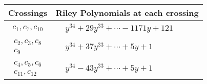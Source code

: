\documentclass[1p]{elsarticle_modified}
\theoremstyle{definition}
\begin{document}
\begin{tabular}{m{50pt}|m{274pt}}
Crossings & \hspace{64pt}Riley Polynomials at each crossing \\
\hline $$\begin{aligned}c_{1},c_{7},c_{10}\end{aligned}$$&$\begin{aligned}
&y^{34}+29 y^{33}+\cdots-1171 y+121
\end{aligned}$\\
\hline $$\begin{aligned}c_{2},c_{3},c_{8}\\c_{9}\end{aligned}$$&$\begin{aligned}
&y^{34}+37 y^{33}+\cdots+5 y+1
\end{aligned}$\\
\hline $$\begin{aligned}c_{4},c_{5},c_{6}\\c_{11},c_{12}\end{aligned}$$&$\begin{aligned}
&y^{34}-43 y^{33}+\cdots+5 y+1
\end{aligned}$\\
\hline
\end{tabular}
\vskip 2pc
\end{document}
